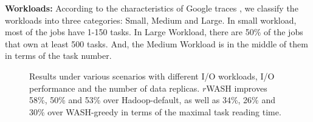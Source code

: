 \documentclass[conference]{IEEEtran}
\begin{document}
\textbf{Workloads:} According to the characteristics of Google traces \cite{b20}, we classify the workloads into three categories: Small, Medium and Large. In small workload, most of the jobs have 1-150 tasks. In Large Workload, there are 50\% of the jobs that own at least 500 tasks. And, the Medium Workload is in the middle of them in terms of the task number.


\begin{figure}[!t]
	\centering
	\quad\quad %
	\quad\quad
	\vspace{-1ex}
	\caption{Results under various scenarios with different I/O workloads, I/O performance and the number of data replicas. $r$WASH improves 58\%, 50\% and 53\% over Hadoop-default, as well as 34\%, 26\% and 30\% over WASH-greedy in terms of the maximal task reading time.}
	\label{Fig:complete}
\end{figure}
\end{document}
